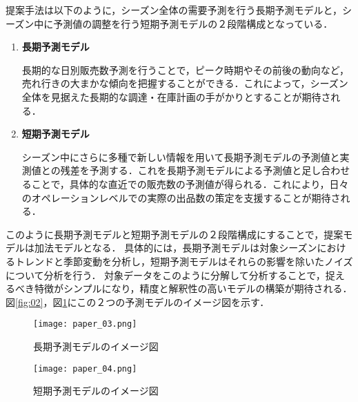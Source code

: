 \documentclass[dvipdfmx]{jreport}
\begin{document}
提案手法は以下のように，シーズン全体の需要予測を行う長期予測モデルと，シーズン中に予測値の調整を行う短期予測モデルの２段階構成となっている．

\begin{tcolorbox}[title=\textbf{モデルの構成}]
    \begin{enumerate}
        \item \textbf{長期予測モデル} 
            \begin{adjustwidth}{10pt}{}
                \hspace{6.5pt} 長期的な日別販売数予測を行うことで，ピーク時期やその前後の動向など，売れ行きの大まかな傾向を把握することができる．これによって，シーズン全体を見据えた長期的な調達・在庫計画の手がかりとすることが期待される．
            \end{adjustwidth}
        \item \textbf{短期予測モデル}
        \begin{adjustwidth}{10pt}{}
            \hspace{6.5pt} シーズン中にさらに多種で新しい情報を用いて長期予測モデルの予測値と実測値との残差を予測する．これを長期予測モデルによる予測値と足し合わせることで，具体的な直近での販売数の予測値が得られる．これにより，日々のオペレーションレベルでの実際の出品数の策定を支援することが期待される．
        \end{adjustwidth}
    \end{enumerate}
\end{tcolorbox}

このように長期予測モデルと短期予測モデルの２段階構成にすることで，提案モデルは加法モデルとなる．
具体的には，長期予測モデルは対象シーズンにおけるトレンドと季節変動を分析し，短期予測モデルはそれらの影響を除いたノイズについて分析を行う．
対象データをこのように分解して分析することで，捉えるべき特徴がシンプルになり，精度と解釈性の高いモデルの構築が期待される．
図\ref{fig:02}，図\ref{fig:03}にこの２つの予測モデルのイメージ図を示す．

\begin{figure}[h]
    \centering
    \begin{minipage}[b]{0.49\columnwidth}
        \centering
        \texttt{[image: paper\_03.png]}
        \caption{長期予測モデルのイメージ図}\label{fig:02}
    \end{minipage}
    \centering
    \begin{minipage}[b]{0.49\columnwidth}
        \centering
        \texttt{[image: paper\_04.png]}
        \caption{短期予測モデルのイメージ図}\label{fig:03}
    \end{minipage}
\end{figure}
\end{document}
